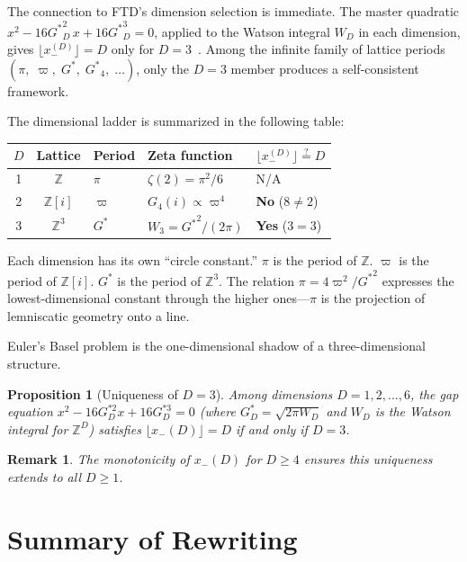 \documentclass[12pt]{article}
\newtheorem{proposition}[theorem]{Proposition}
\newtheorem{remark}[theorem]{Remark}
\newcommand{\Z}{\mathbb{Z}}
\begin{document}
The connection to FTD's dimension selection is immediate.  The master
quadratic $x^2 - 16{G^{*}}_D^2\,x + 16{G^{*}}_D^3 = 0$, applied to the
Watson integral $W_D$ in each dimension, gives $\lfloor x_-^{(D)}\rfloor = D$
only for $D = 3$~\cite{lifecycle}.  Among the infinite family of lattice
periods $(\pi,\; \varpi,\; {G^{*}},\; {G^{*}}_4,\; \ldots)$, only the
$D = 3$ member produces a self-consistent framework.

The dimensional ladder is summarized in the following table:

\begin{center}
\begin{tabular}{cclll}
\toprule
$D$ & Lattice & Period & Zeta function & $\lfloor x_-^{(D)}\rfloor \stackrel{?}{=} D$ \\
\midrule
1 & $\Z$ & $\pi$ & $\zeta(2) = \pi^2/6$ & N/A \\
2 & $\Z[i]$ & $\varpi$ & $G_4(i) \propto \varpi^4$ & \textbf{No} ($8 \neq 2$) \\
3 & $\Z^3$ & ${G^{*}}$ & $W_3 = {{G^{*}}}^2/(2\pi)$ & \textbf{Yes} ($3 = 3$) \\
\bottomrule
\end{tabular}
\end{center}

\noindent Each dimension has its own ``circle constant.'' $\pi$ is the period of $\Z$. $\varpi$ is the period of $\Z[i]$. ${G^{*}}$ is the period of $\Z^3$. The relation $\pi = 4\varpi^2/{{G^{*}}}^2$ expresses the lowest-dimensional constant through the higher ones---$\pi$ is the projection of lemniscatic geometry onto a line.

Euler's Basel problem is the one-dimensional shadow of a three-dimensional structure.

\begin{proposition}[Uniqueness of $D = 3$]
Among dimensions $D = 1, 2, \ldots, 6$, the gap equation $x^2 - 16G_D^{*2}x + 16G_D^{*3} = 0$ (where $G_D^* = \sqrt{2\pi W_D}$ and $W_D$ is the Watson integral for $\mathbb{Z}^D$) satisfies $\lfloor x_-(D) \rfloor = D$ if and only if $D = 3$.
\end{proposition}

\begin{remark}
The monotonicity of $x_-(D)$ for $D \geq 4$ ensures this uniqueness extends to all $D \geq 1$.
\end{remark}

\section{Summary of Rewriting}\label{sec:summary}
\end{document}

